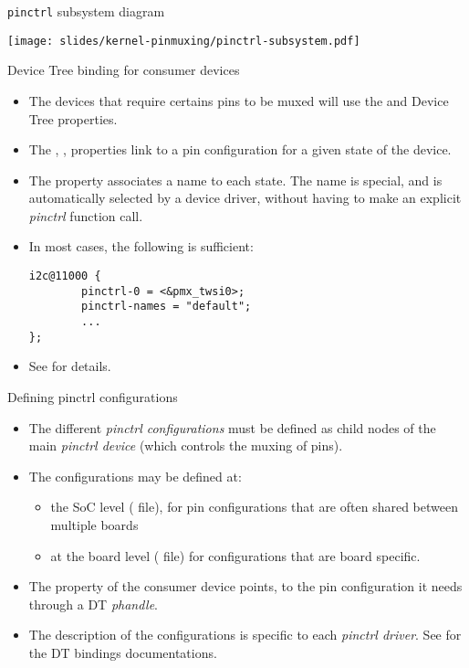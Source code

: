 \begin{frame}{{\tt pinctrl} subsystem diagram}
  \begin{center}
    \texttt{[image: slides/kernel-pinmuxing/pinctrl-subsystem.pdf]}
  \end{center}
\end{frame}

\begin{frame}[fragile]{Device Tree binding for consumer devices}
  \begin{itemize}
  \item The devices that require certains pins to be muxed will use
    the  and  Device Tree
    properties.
  \item The , , 
    properties link to a pin configuration for a given state of the
    device.
  \item The  property associates a name to each
    state. The name  is special, and is automatically
    selected by a device driver, without having to make an explicit
    {\em pinctrl} function call.
  \item In most cases, the following is sufficient:
    \begin{verbatim}
i2c@11000 {
        pinctrl-0 = <&pmx_twsi0>;
        pinctrl-names = "default";
        ...
};
\end{verbatim}
\item See
  for details.
\end{itemize}
\end{frame}

\begin{frame}{Defining pinctrl configurations}
  \begin{itemize}
  \item The different {\em pinctrl configurations} must be defined as
    child nodes of the main {\em pinctrl device} (which controls the
    muxing of pins).
  \item The configurations may be defined at:
    \begin{itemize}
    \item the SoC level ( file), for pin configurations
      that are often shared between multiple boards
    \item at the board level ( file) for configurations
      that are board specific.
    \end{itemize}
  \item The  property of the consumer device points,
    to the pin configuration it needs through a DT {\em phandle}.
  \item The description of the configurations is specific to each {\em
      pinctrl driver}. See
     for the DT
    bindings documentations.
  \end{itemize}
\end{frame}

